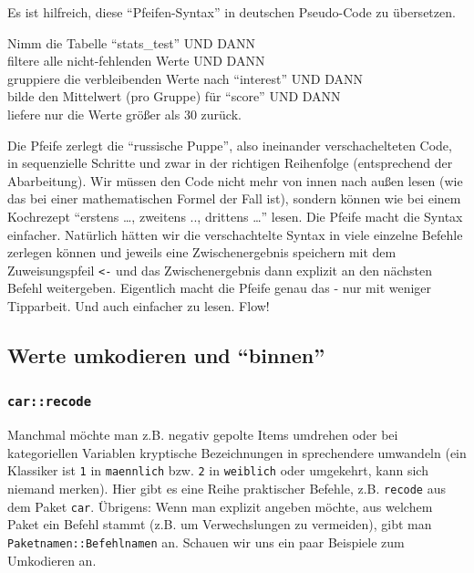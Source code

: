 \documentclass[12pt,]{book}
\let\BeginKnitrBlock\begin \let\EndKnitrBlock\end
\begin{document}
Es ist hilfreich, diese ``Pfeifen-Syntax'' in deutschen Pseudo-Code zu
übersetzen.

\BeginKnitrBlock{rmdpseudocode}
Nimm die Tabelle ``stats\_test'' UND DANN\\
filtere alle nicht-fehlenden Werte UND DANN\\
gruppiere die verbleibenden Werte nach ``interest'' UND DANN\\
bilde den Mittelwert (pro Gruppe) für ``score'' UND DANN\\
liefere nur die Werte größer als 30 zurück.
\EndKnitrBlock{rmdpseudocode}

Die Pfeife zerlegt die ``russische Puppe'', also ineinander
verschachelteten Code, in sequenzielle Schritte und zwar in der
richtigen Reihenfolge (entsprechend der Abarbeitung). Wir müssen den
Code nicht mehr von innen nach außen lesen (wie das bei einer
mathematischen Formel der Fall ist), sondern können wie bei einem
Kochrezept ``erstens \ldots{}, zweitens .., drittens \ldots{}'' lesen.
Die Pfeife macht die Syntax einfacher. Natürlich hätten wir die
verschachtelte Syntax in viele einzelne Befehle zerlegen können und
jeweils eine Zwischenergebnis speichern mit dem Zuweisungspfeil
\texttt{\textless{}-} und das Zwischenergebnis dann explizit an den
nächsten Befehl weitergeben. Eigentlich macht die Pfeife genau das - nur
mit weniger Tipparbeit. Und auch einfacher zu lesen. Flow!

\subsection{\texorpdfstring{Werte umkodieren und
``binnen''}{Werte umkodieren und binnen}}\label{werte-umkodieren-und-binnen}

\subsubsection{\texorpdfstring{\texttt{car::recode}}{car::recode}}\label{carrecode}

Manchmal möchte man z.B. negativ gepolte Items umdrehen oder bei
kategoriellen Variablen kryptische Bezeichnungen in sprechendere
umwandeln (ein Klassiker ist \texttt{1} in \texttt{maennlich} bzw.
\texttt{2} in \texttt{weiblich} oder umgekehrt, kann sich niemand
merken). Hier gibt es eine Reihe praktischer Befehle, z.B.
\texttt{recode} aus dem Paket \texttt{car}. Übrigens: Wenn man explizit
angeben möchte, aus welchem Paket ein Befehl stammt (z.B. um
Verwechslungen zu vermeiden), gibt man \texttt{Paketnamen::Befehlnamen}
an. Schauen wir uns ein paar Beispiele zum Umkodieren an.
\end{document}
